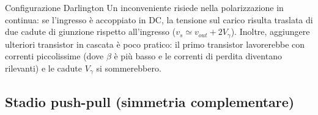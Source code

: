 \begin{definizione}{Configurazione Darlington}
    Un inconveniente risiede nella polarizzazione in continua: se l'ingresso è accoppiato in DC, la tensione sul carico risulta traslata di due cadute di giunzione rispetto all'ingresso ($v_s \simeq v_{out} + 2V_\gamma$). Inoltre, aggiungere ulteriori transistor in cascata è poco pratico: il primo transistor lavorerebbe con correnti piccolissime (dove $\beta$ è più basso e le correnti di perdita diventano rilevanti) e le cadute $V_\gamma$ si sommerebbero.
\end{definizione}

\subsection{Stadio push-pull (simmetria complementare)}

